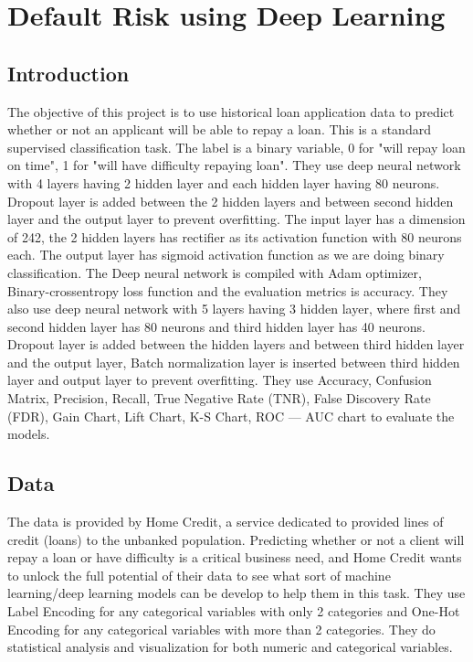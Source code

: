\documentclass{article}
\begin{document}
\section{Default Risk using Deep Learning}
\subsection{Introduction}
The objective of this project is to use historical loan application data to predict whether or not an applicant will be able to repay a loan. This is a standard supervised classification task. The label is a binary variable, 0 for "will repay loan on time", 1 for "will have difficulty repaying loan".
They use deep neural network with 4 layers having 2 hidden layer and each hidden layer having 80 neurons. Dropout layer is added between the 2 hidden layers and between second hidden layer and the output layer to prevent overfitting. The input layer has a dimension of 242, the 2 hidden layers has rectifier as its activation function with 80 neurons each. The output layer has sigmoid activation function as we are doing binary classification. The Deep neural network is compiled with Adam optimizer, Binary-crossentropy loss function and the evaluation metrics is accuracy.
They also use deep neural network with 5 layers having 3 hidden layer, where first and second hidden layer has 80 neurons and third hidden layer has 40 neurons. Dropout layer is added between the hidden layers and between third hidden layer and the output layer, Batch normalization layer is inserted between third hidden layer and output layer to prevent overfitting.
They use Accuracy, Confusion Matrix, Precision, Recall, True Negative Rate (TNR), False Discovery Rate (FDR), Gain Chart, Lift Chart, K-S Chart, ROC — AUC chart to evaluate the models. 
\subsection{Data}
The data is provided by Home Credit, a service dedicated to provided lines of credit (loans) to the unbanked population. Predicting whether or not a client will repay a loan or have difficulty is a critical business need, and Home Credit wants to unlock the full potential of their data to see what sort of machine learning/deep learning models can be develop to help them in this task.
They use Label Encoding for any categorical variables with only 2 categories and One-Hot Encoding for any categorical variables with more than 2 categories. They do statistical analysis and visualization for both numeric and categorical variables.
\end{document}
